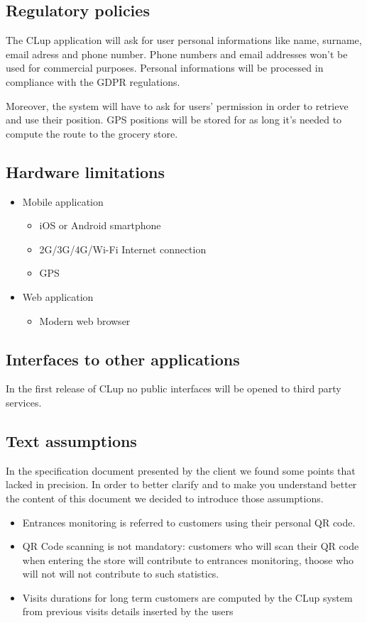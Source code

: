 \subsection{Regulatory policies}
The CLup application will ask for user personal informations like name, surname, email adress and phone number. Phone numbers and email addresses won't be used for commercial purposes.
Personal informations will be processed in compliance with the GDPR regulations.

Moreover, the system will have to ask for users' permission in order to retrieve and use their position. GPS positions will be stored for as long it's needed to compute the route to the grocery store.

\subsection{Hardware limitations}
\begin{itemize}
    \item Mobile application
    \begin{itemize}
        \item iOS or Android smartphone
        \item 2G/3G/4G/Wi-Fi Internet connection
        \item GPS
    \end{itemize}
    \item Web application
    \begin{itemize}
        \item Modern web browser
    \end{itemize}
\end{itemize}

\subsection{Interfaces to other applications}
In the first release of CLup no public interfaces will be opened to third party services.

\subsection{Text assumptions}
In the specification document presented by the client we found some points that lacked in precision. In order to better clarify and to make you understand better the content of this document we decided to introduce those assumptions.
\begin{itemize}
    \item Entrances monitoring is referred to customers using their personal QR code.
    \item QR Code scanning is not mandatory: customers who will scan their QR code when entering the store will contribute to entrances monitoring, thoose who will not will not contribute to such statistics.
    \item Visits durations for long term customers are computed by the CLup system from previous visits details inserted by the users
\end{itemize}

